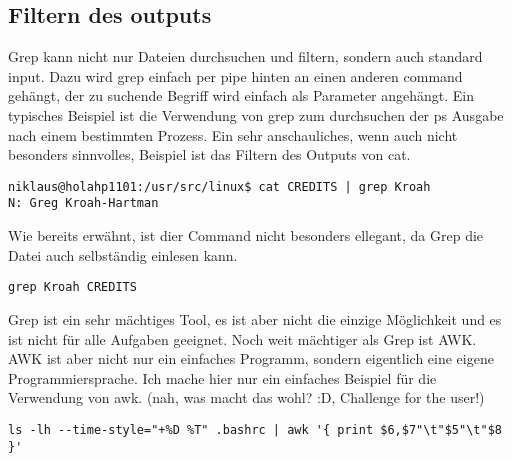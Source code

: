\subsection{Filtern des outputs}
Grep kann nicht nur Dateien durchsuchen und filtern, sondern auch standard input. Dazu wird grep einfach per pipe hinten an einen anderen command geh\"angt, der zu suchende Begriff wird einfach als Parameter angeh\"angt. Ein typisches Beispiel ist die Verwendung von grep zum durchsuchen der ps Ausgabe nach einem bestimmten Prozess. Ein sehr anschauliches, wenn auch nicht besonders sinnvolles, Beispiel ist das Filtern des Outputs von cat.
\begin{lstlisting}
niklaus@holahp1101:/usr/src/linux$ cat CREDITS | grep Kroah
N: Greg Kroah-Hartman
\end{lstlisting}
Wie bereits erw\"ahnt, ist dier Command nicht besonders ellegant, da Grep die Datei auch selbst\"andig einlesen kann.
\begin{lstlisting}
grep Kroah CREDITS
\end{lstlisting}
Grep ist ein sehr m\"achtiges Tool, es ist aber nicht die einzige M\"oglichkeit und es ist nicht f\"ur alle Aufgaben geeignet. Noch weit m\"achtiger als Grep ist AWK. AWK ist aber nicht nur ein einfaches Programm, sondern eigentlich eine eigene Programmiersprache. Ich mache hier nur ein einfaches Beispiel f\"ur die Verwendung von awk. (nah, was macht das wohl? :D, Challenge for the user!)
\begin{lstlisting}
ls -lh --time-style="+%D %T" .bashrc | awk '{ print $6,$7"\t"$5"\t"$8 }'
\end{lstlisting}
